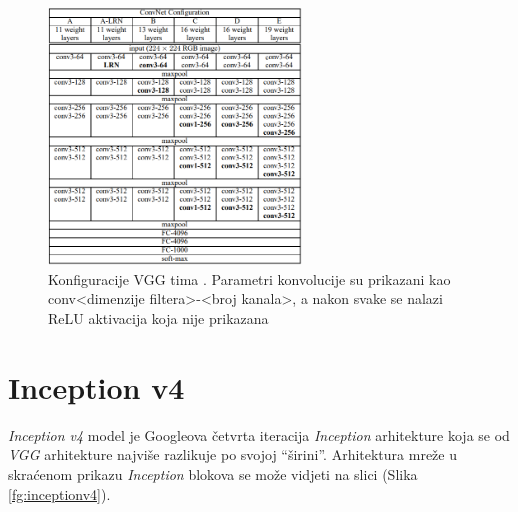\documentclass[times, utf8, proizvoljni, numeric]{fer}
\begin{document}
\begin{figure}[!ht]
	\begin{center}
		\captionsetup{justification=centering}
		\includegraphics[width=0.6\textwidth]{./imgs/vgg.png}
		\caption{Konfiguracije VGG tima \cite{VGG}. Parametri konvolucije su prikazani kao conv<dimenzije filtera>-<broj kanala>, a nakon svake se nalazi ReLU aktivacija koja nije prikazana}
		\label{fg:vgg}
	\end{center}
\end{figure}

\section{Inception v4}

\textit{Inception v4} model je Googleova četvrta iteracija \textit{Inception} arhitekture koja se od \textit{VGG} arhitekture najviše razlikuje po svojoj “širini”.  Arhitektura mreže u skraćenom prikazu \textit{Inception} blokova se može vidjeti na slici (Slika \ref{fg:inceptionv4}). 
\end{document}
